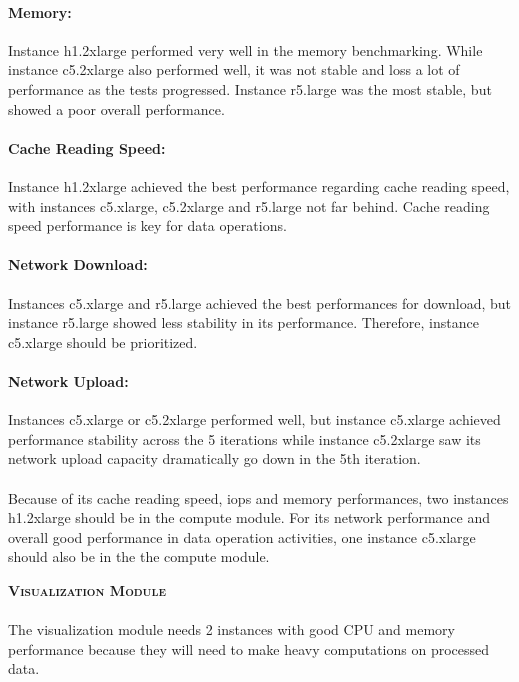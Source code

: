 \documentclass[11pt]{article}
\begin{document}
		\paragraph{Memory:} Instance h1.2xlarge performed very well in the
		memory benchmarking. While instance c5.2xlarge also performed well, it
		was not stable and loss a lot of performance as the tests progressed.
		Instance r5.large was the most stable, but showed a poor overall
		performance.

		\paragraph{Cache Reading Speed:} Instance h1.2xlarge achieved the best
		performance regarding cache reading speed, with instances c5.xlarge,
		c5.2xlarge and r5.large not far behind. Cache reading speed performance
		is key for data operations.

		\paragraph{Network Download:} Instances c5.xlarge and r5.large achieved
		the best performances for download, but instance r5.large showed less
		stability in its performance. Therefore, instance c5.xlarge should be
		prioritized.

		\paragraph{Network Upload:} Instances c5.xlarge or c5.2xlarge performed
		well, but instance c5.xlarge achieved performance stability across the 5
		iterations while instance c5.2xlarge saw its network upload capacity
		dramatically go down in the 5th iteration.

		\paragraph{} Because of its cache reading speed, iops and memory
		performances, two instances h1.2xlarge should be in the compute module.
		For its network performance and overall good performance in data
		operation activities, one instance c5.xlarge should also be in the the
		compute module. \pagebreak
		
		\textsc{\Large{\textbf{Visualization Module}}}

		\paragraph{} The visualization module needs 2 instances with good CPU and memory
		performance because they will need to make heavy computations on
		processed data.
\end{document}
